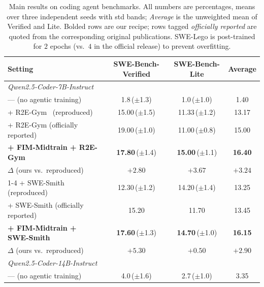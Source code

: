 \begin{table}[t]
\centering
\caption{Main results on coding agent benchmarks. All numbers are
percentages, means over three independent seeds with std bands;
\emph{Average} is the unweighted mean of Verified and Lite. Bolded rows
are our recipe; rows tagged \emph{officially reported} are quoted from
the corresponding original publications. SWE-Lego is post-trained for
$2$ epochs (vs.\ $4$ in the official release) to prevent overfitting.}
\label{tab:main}
\setlength{\tabcolsep}{6pt}
\begin{tabular}{lccc}
\toprule
Setting & SWE-Bench-Verified & SWE-Bench-Lite & Average \\
\midrule
\multicolumn{4}{l}{\textit{Qwen2.5-Coder-7B-Instruct}} \\
\quad --- (no agentic training)                       & 1.8\,($\pm$1.3)            & 1.0\,($\pm$1.0)            & 1.40 \\
\quad + R2E-Gym~\citep{r2egym} (reproduced)           & 15.00\,($\pm$1.5)          & 11.33\,($\pm$1.2)          & 13.17 \\
\quad + R2E-Gym (officially reported)                 & 19.00\,($\pm$1.0)          & 11.00\,($\pm$0.8)          & 15.00 \\
\quad \textbf{+ FIM-Midtrain + R2E-Gym}               & \textbf{17.80}\,($\pm$1.4) & \textbf{15.00}\,($\pm$1.1) & \textbf{16.40} \\
\rowcolor{blue!8}
\quad\quad $\Delta$ (ours vs.\ reproduced)            & $+2.80$                    & $+3.67$                    & $+3.24$ \\
\cmidrule(lr){1-4}
\quad + SWE-Smith~\citep{swesmith} (reproduced)       & 12.30\,($\pm$1.2)          & 14.20\,($\pm$1.4)          & 13.25 \\
\quad + SWE-Smith (officially reported)               & 15.20                       & 11.70                       & 13.45 \\
\quad \textbf{+ FIM-Midtrain + SWE-Smith}             & \textbf{17.60}\,($\pm$1.3) & \textbf{14.70}\,($\pm$1.0) & \textbf{16.15} \\
\rowcolor{blue!8}
\quad\quad $\Delta$ (ours vs.\ reproduced)            & $+5.30$                    & $+0.50$                    & $+2.90$ \\
\midrule
\multicolumn{4}{l}{\textit{Qwen2.5-Coder-14B-Instruct}} \\
\quad --- (no agentic training)                       & 4.0\,($\pm$1.6)            & 2.7\,($\pm$1.0)            & 3.35 \\

\end{tabular}
\end{table}
